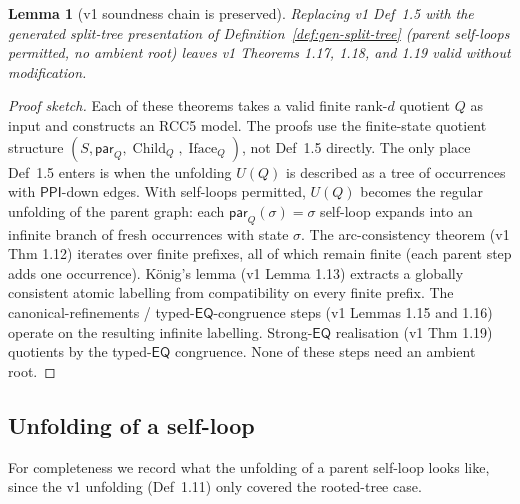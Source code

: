 \documentclass[11pt]{article}
\newtheorem{lemma}[theorem]{Lemma}
\theoremstyle{definition}
\theoremstyle{remark}
\newcommand{\PPI}{\mathsf{PPI}}
\newcommand{\EQ}{\mathsf{EQ}}
\newcommand{\Child}{\operatorname{Child}}
\newcommand{\Iface}{\operatorname{Iface}}
\begin{document}
\begin{lemma}[v1 soundness chain is preserved]\label{lem:soundness-preserved}
Replacing v1 Def~1.5 with the generated split-tree presentation of
Definition~\ref{def:gen-split-tree} (parent self-loops permitted,
no ambient root) leaves v1 Theorems 1.17, 1.18, and 1.19 valid
without modification.
\end{lemma}

\begin{proof}[Proof sketch]
Each of these theorems takes a valid finite rank-$d$ quotient $Q$
as input and constructs an RCC5 model. The proofs use the
finite-state quotient structure $(S, \mathsf{par}_Q, \Child_Q,
\Iface_Q)$, not Def~1.5 directly. The only place Def~1.5 enters is
when the unfolding $U(Q)$ is described as a tree of occurrences
with $\PPI$-down edges. With self-loops permitted, $U(Q)$ becomes
the regular unfolding of the parent graph: each
$\mathsf{par}_Q(\sigma) = \sigma$ self-loop expands into an
infinite branch of fresh occurrences with state $\sigma$. The
arc-consistency theorem (v1 Thm 1.12) iterates over finite
prefixes, all of which remain finite (each parent step adds one
occurrence). König's lemma (v1 Lemma 1.13) extracts a globally
consistent atomic labelling from compatibility on every finite
prefix. The canonical-refinements / typed-$\EQ$-congruence steps
(v1 Lemmas 1.15 and 1.16) operate on the resulting infinite
labelling. Strong-$\EQ$ realisation (v1 Thm 1.19) quotients by the
typed-$\EQ$ congruence. None of these steps need an ambient root.
\end{proof}

\subsection{Unfolding of a self-loop}
\label{sec:unfolding}

For completeness we record what the unfolding of a parent
self-loop looks like, since the v1 unfolding (Def~1.11) only
covered the rooted-tree case.
\end{document}
